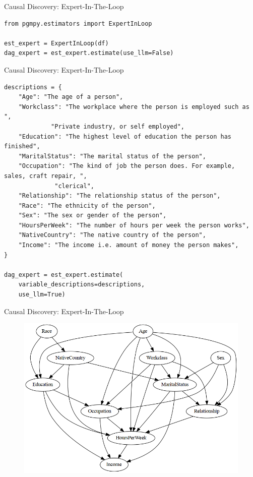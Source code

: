 \documentclass[aspectratio=169]{beamer}
\begin{document}
\begin{frame}[fragile]{Causal Discovery: Expert-In-The-Loop}
	\begin{verbatim}
from pgmpy.estimators import ExpertInLoop

est_expert = ExpertInLoop(df)
dag_expert = est_expert.estimate(use_llm=False)
	\end{verbatim}
\end{frame}

\begin{frame}[fragile]{Causal Discovery: Expert-In-The-Loop}
	\begin{verbatim}
descriptions = {
    "Age": "The age of a person",
    "Workclass": "The workplace where the person is employed such as ",
    		 "Private industry, or self employed",
    "Education": "The highest level of education the person has finished",
    "MaritalStatus": "The marital status of the person",
    "Occupation": "The kind of job the person does. For example, sales, craft repair, ",
    		  "clerical",
    "Relationship": "The relationship status of the person",
    "Race": "The ethnicity of the person",
    "Sex": "The sex or gender of the person",
    "HoursPerWeek": "The number of hours per week the person works",
    "NativeCountry": "The native country of the person",
    "Income": "The income i.e. amount of money the person makes",
}

dag_expert = est_expert.estimate(
    variable_descriptions=descriptions,
    use_llm=True)
	\end{verbatim}
\end{frame}

\begin{frame}{Causal Discovery: Expert-In-The-Loop}
	\begin{figure}
		\centering
		\includegraphics[scale=0.35]{imgs/adult_llm.png}
	\end{figure}
\end{frame}
\end{document}
